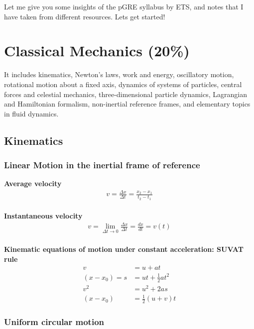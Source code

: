 \documentclass[12pt,a4paper]{article}
\begin{document}
Let me give you some insights of the pGRE syllabus by ETS, and notes that I have taken from different resources. Lets get started!

\section{Classical Mechanics (20\%)}

It includes kinematics, Newton's laws, work and energy, oscillatory motion, rotational motion about a fixed axis, dynamics of systems of particles, central forces and celestial mechanics, three-dimensional particle dynamics, Lagrangian and Hamiltonian formalism, non-inertial reference frames, and elementary topics in fluid dynamics.

\subsection{Kinematics}

\subsubsection{Linear Motion in the inertial frame of reference}

\noindent\textbf{Average velocity}
\begin{align}
v = \frac{\Delta x}{\Delta t} = \frac{x_{2} - x_{1}}{t_{2} - t_{1}}
\end{align}
\\
\textbf{Instantaneous velocity}
\begin{align}
v = \lim_{\Delta t \to 0} \frac{\Delta x}{\Delta t} = \frac{dx}{dt} = v(t)
\end{align}
\\
\textbf{Kinematic equations of motion under constant acceleration: SUVAT rule}
\begin{align}
v &= u + at\\
(x - x_{0}) = s &= ut + \frac{1}{2}at^{2} \\
v^{2} &= u^{2} + 2as \\
(x - x_{0}) &= \frac{1}{2}(u + v)t 
\end{align}

\subsubsection{Uniform circular motion}
\end{document}
